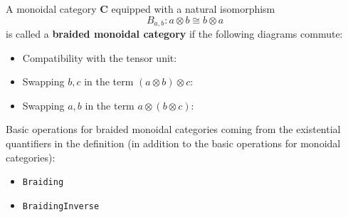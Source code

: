 \begin{definition}
 A monoidal category $\mathbf{C}$ equipped with a natural isomorphism
 \[
  B_{a,b}: a \otimes b \cong b \otimes a
 \]
 is called a \textbf{braided monoidal category}
 if the following diagrams commute:
 
 \begin{itemize}
  \item Compatibility with the tensor unit:
  \begin{center}
  \end{center}
 
  \item Swapping $b,c$ in the term $(a \otimes b) \otimes c$:
  \begin{center}
  \end{center}
  
  \item Swapping $a,b$ in the term $a \otimes (b \otimes c)$:
  \begin{center}
  \end{center}
 \end{itemize}
\end{definition}

Basic operations for braided monoidal categories coming from the existential quantifiers
in the definition
(in addition to the basic operations for monoidal categories):
\begin{itemize}
 \item \texttt{Braiding}
 \item \texttt{BraidingInverse}
\end{itemize}


